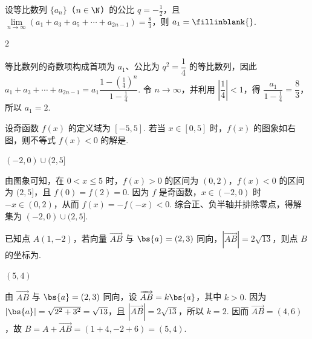 \begin{problem}
设等比数列 \(\{a_{n}\}\)（\(n \in \N\)）的公比 \(q = -\frac{1}{2}\)，且 \(\displaystyle\lim\limits_{n \to \infty} (a_{1} + a_{3} + a_{5} + \cdots + a_{2n-1}) = \frac{8}{3}\)，则 \(a_{1} =\fillinblank{}\).

\end{problem}

\begin{answer}
\(2\)
\end{answer}

\begin{solution}
等比数列的奇数项构成首项为 \(a_{1}\)、公比为 \(q^{2}=\dfrac14\) 的等比数列，因此
\(a_{1}+a_{3}+\cdots+a_{2n-1}=a_{1}\dfrac{1-(\frac14)^{n}}{1-\frac14}\). 令 \(n\to\infty\)，并利用 \(\left|\dfrac14\right|<1\)，得
\(\dfrac{a_{1}}{1-\frac14}=\dfrac83\)，所以 \(a_{1}=2\).
\end{solution}

\begin{problem}
设奇函数 \( f(x) \) 的定义域为 \([-5, 5]\). 若当 \( x \in [0, 5] \) 时，\( f(x) \) 的图象如右图，则不等式 \( f(x) < 0 \) 的解是\fillinblank{}.

\end{problem}

\begin{answer}
\((-2,0) \cup (2,5]\)
\end{answer}

\begin{solution}
由图象可知，在 \(0<x\leqslant5\) 时，\(f(x)>0\) 的区间为 \((0,2)\)，\(f(x)<0\) 的区间为 \((2,5]\)，且 \(f(0)=f(2)=0\). 因为 \(f\) 是奇函数，\(x\in(-2,0)\) 时 \(-x\in(0,2)\)，从而 \(f(x)=-f(-x)<0\). 综合正、负半轴并排除零点，得解集为 \((-2,0)\cup(2,5]\).
\end{solution}

\begin{problem}
已知点 \(A(1, -2)\)，若向量 \(\overrightarrow{AB}\) 与 \(\bs{a} = (2, 3)\) 同向，\(\left|\overrightarrow{AB}\right| = 2\sqrt{13}\)，则点 \(B\) 的坐标为\fillinblank{}.

\end{problem}

\begin{answer}
\((5,4)\)
\end{answer}

\begin{solution}
由 \(\overrightarrow{AB}\) 与 \(\bs{a}=(2,3)\) 同向，设 \(\overrightarrow{AB}=k\bs{a}\)，其中 \(k>0\). 因为 \(\left|\bs{a}\right|=\sqrt{2^{2}+3^{2}}=\sqrt{13}\)，且 \(\left|\overrightarrow{AB}\right|=2\sqrt{13}\)，所以 \(k=2\). 因而 \(\overrightarrow{AB}=(4,6)\)，故 \(B=A+\overrightarrow{AB}=(1+4,-2+6)=(5,4)\).
\end{solution}

